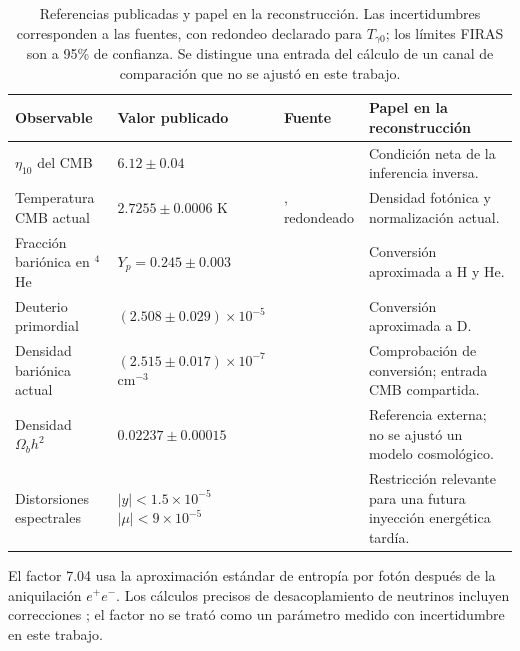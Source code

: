 \begin{table}[t]
\centering\small
\caption{Referencias publicadas y papel en la reconstrucción. Las incertidumbres corresponden a las fuentes, con redondeo declarado para $T_{\gamma0}$; los límites FIRAS son a 95\% de confianza. Se distingue una entrada del cálculo de un canal de comparación que no se ajustó en este trabajo.}
\label{tab:external}
\setlength{\tabcolsep}{5pt}\renewcommand{\arraystretch}{1.15}
\begin{tabular}{>{\raggedright\arraybackslash}p{}>{\raggedright\arraybackslash}p{}>{\raggedright\arraybackslash}p{}>{\raggedright\arraybackslash}p{}}\toprule
Observable & Valor publicado & Fuente & Papel en la reconstrucción\\\midrule
$\eta_{10}$ del CMB & $6.12\pm0.04$ & \citet{Fields2025} & Condición neta de la inferencia inversa.\\
Temperatura CMB actual & $2.7255\pm0.0006$ K & \citet{Fixsen2009}, redondeado & Densidad fotónica y normalización actual.\\
Fracción bariónica en $^4$He & $Y_p=0.245\pm0.003$ & \citet{Fields2025} & Conversión aproximada a H y He.\\
Deuterio primordial & $(2.508\pm0.029)\times10^{-5}$ & \citet{Fields2025} & Conversión aproximada a D.\\
Densidad bariónica actual & $(2.515\pm0.017)\times10^{-7}$ cm$^{-3}$ & \citet{Groom2025} & Comprobación de conversión; entrada CMB compartida.\\
Densidad $\Omega_bh^2$ & $0.02237\pm0.00015$ & \citet{Planck2020} & Referencia externa; no se ajustó un modelo cosmológico.\\
Distorsiones espectrales & $|y|<1.5\times10^{-5}$\newline $|\mu|<9\times10^{-5}$ & \citet{Fixsen1996} & Restricción relevante para una futura inyección energética tardía.\\
\bottomrule\end{tabular}
\end{table}

El factor 7.04 usa la aproximación estándar de entropía por fotón después de la aniquilación $e^+e^-$. Los cálculos precisos de desacoplamiento de neutrinos incluyen correcciones \citep{Froustey2020}; el factor no se trató como un parámetro medido con incertidumbre en este trabajo.

